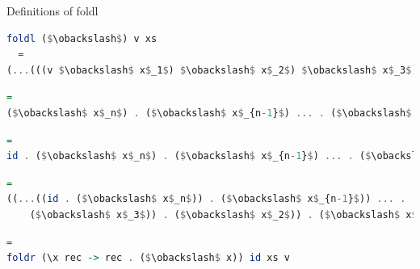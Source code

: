 \documentclass[lualatex]{beamer}
\renewcommand{\_}{\textscale{.6}{\textunderscore}}
\begin{document}

\begin{frame}[fragile]{Definitions of foldl}
\begin{lstlisting}[language=Haskell, morekeywords={foldr,foldl}]
foldl ($\obackslash$) v xs
  =
(...(((v $\obackslash$ x$_1$) $\obackslash$ x$_2$) $\obackslash$ x$_3$) ... $\obackslash$ x$_{n-1}$) $\obackslash$ x$_n$
\end{lstlisting}
\pause
\begin{lstlisting}[language=Haskell, morekeywords={foldr,foldl}]
  =
($\obackslash$ x$_n$) . ($\obackslash$ x$_{n-1}$) ... . ($\obackslash$ x$_3$) . ($\obackslash$ x$_2$) . ($\obackslash$ x$_1$) $\textdollar$ v
\end{lstlisting}
\pause
\begin{lstlisting}[language=Haskell, morekeywords={foldr,foldl}]
  =
id . ($\obackslash$ x$_n$) . ($\obackslash$ x$_{n-1}$) ... . ($\obackslash$ x$_3$) . ($\obackslash$ x$_2$) . ($\obackslash$ x$_1$) $\textdollar$ v
\end{lstlisting}
\pause
\begin{lstlisting}[language=Haskell, morekeywords={foldr,foldl}]
  =
((...((id . ($\obackslash$ x$_n$)) . ($\obackslash$ x$_{n-1}$)) ... .
    ($\obackslash$ x$_3$)) . ($\obackslash$ x$_2$)) . ($\obackslash$ x$_1$) $\textdollar$ v
\end{lstlisting}
\pause
\begin{lstlisting}[language=Haskell, morekeywords={foldr,foldl}]
  =
foldr (\x rec -> rec . ($\obackslash$ x)) id xs v
\end{lstlisting}
\end{frame}

\end{document}
